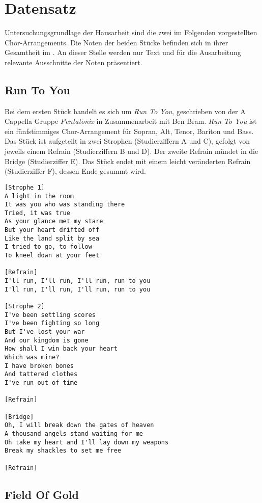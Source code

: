 \chapter{Datensatz}
\label{chap:Datensatz}
\pagestyle{plain}

Untersuchungsgrundlage der Hausarbeit sind die zwei im Folgenden vorgestellten Chor-Arrangements. Die Noten der beiden Stücke befinden sich in ihrer Gesamtheit im . An dieser Stelle werden nur Text und für die Ausarbeitung relevante Ausschnitte der Noten präsentiert.

\section{Run To You}

Bei dem ersten Stück handelt es sich um \textit{Run To You}, geschrieben von der A Cappella Gruppe \textit{Pentatonix} in Zusammenarbeit mit Ben Bram. \textit{Run To You} ist ein fünfstimmiges Chor-Arrangement für Sopran, Alt, Tenor, Bariton und Bass. Das Stück ist aufgeteilt in zwei Strophen (Studierziffern A und C), gefolgt von jeweils einem Refrain (Studierziffern B und D). Der zweite Refrain mündet in die Bridge (Studierziffer E). Das Stück endet mit einem leicht veränderten Refrain (Studierziffer F), dessen Ende gesummt wird.

\begin{verbatim}
[Strophe 1]
A light in the room
It was you who was standing there
Tried, it was true
As your glance met my stare
But your heart drifted off
Like the land split by sea
I tried to go, to follow
To kneel down at your feet

[Refrain]
I'll run, I'll run, I'll run, run to you
I'll run, I'll run, I'll run, run to you

[Strophe 2]
I've been settling scores
I've been fighting so long
But I've lost your war
And our kingdom is gone
How shall I win back your heart
Which was mine?
I have broken bones
And tattered clothes
I've run out of time

[Refrain]

[Bridge]
Oh, I will break down the gates of heaven
A thousand angels stand waiting for me
Oh take my heart and I'll lay down my weapons
Break my shackles to set me free

[Refrain]
\end{verbatim}

\section{Field Of Gold}

